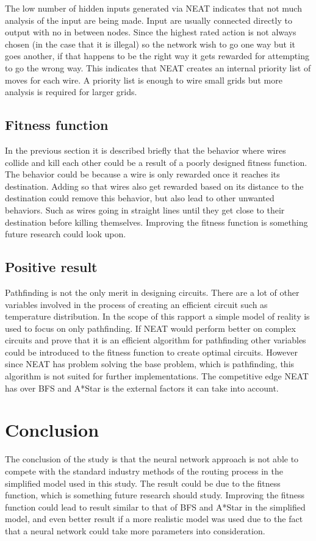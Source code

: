 \documentclass{kththesis}
\begin{document}
The low number of hidden inputs generated via NEAT indicates that not much analysis of the input are being made. Input are usually connected directly to output with no in between nodes. Since the highest rated action is not always chosen (in the case that it is illegal) so the network wish to go one way but it goes another, if that happens to be the right way it gets rewarded for attempting to go the wrong way. This indicates that NEAT creates an internal priority list of moves for each wire. A priority list is enough to wire small grids but more analysis is required for larger grids.
 
\section{Fitness function}
In the previous section it is described briefly that the behavior where wires collide and kill each other could be a result of a poorly designed fitness function. The behavior could be because a wire is only rewarded once it reaches its destination. Adding so that wires also get rewarded based on its distance to the destination could remove this behavior, but also lead to other unwanted behaviors. Such as wires going in straight lines until they get close to their destination before killing themselves. Improving the fitness function is something future research could look upon.
 
\section{Positive result}
Pathfinding is not the only merit in designing circuits. There are a lot of other variables involved in the process of creating an efficient circuit such as temperature distribution. In the scope of this rapport a simple model of reality is used to focus on only pathfinding. If NEAT would perform better on complex circuits and prove that it is an efficient algorithm for pathfinding other variables could be introduced to the fitness function to create optimal circuits. However since NEAT has problem solving the base problem, which is pathfinding, this algorithm is not suited for further implementations. The competitive edge NEAT has over BFS and A*Star is the external factors it can take into account.
 
\chapter{Conclusion}
The conclusion of the study is that the neural network approach is not able to compete with the standard industry methods of the routing process in the simplified model used in this study. The result could be due to the fitness function, which is something future research should study. Improving the fitness function could lead to result similar to that of BFS and A*Star in the simplified model, and even better result if a more realistic model was used due to the fact that a neural network could take more parameters into consideration.
 
\end{document}
